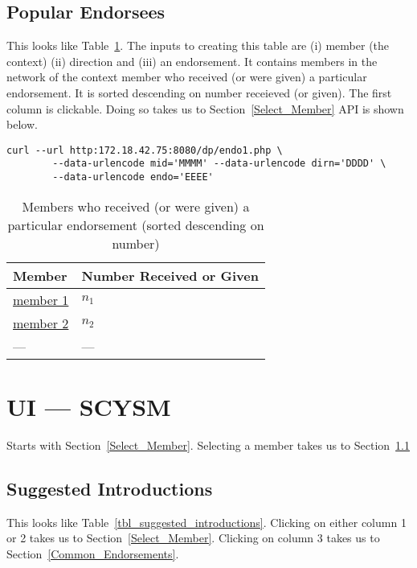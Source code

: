 \subsection{Popular Endorsees}
\label{Popular_Endorsees}

This looks like Table~\ref{tbl_popular_endorsees}. The inputs to
creating this table are (i) member (the context) (ii) direction and (iii) an
endorsement. 
It contains members in the network of the context member who 
received (or were given) a particular endorsement. It is sorted descending 
on number receieved (or given).
The first column is
clickable. Doing so takes us to Section~\ref{Select_Member}
API is shown below.
\begin{verbatim}
curl --url http:172.18.42.75:8080/dp/endo1.php \
       	--data-urlencode mid='MMMM' --data-urlencode dirn='DDDD' \
       	--data-urlencode endo='EEEE' 
\end{verbatim}


\begin{table}[hb]
\centering
\begin{tabular}{|l|l|} \hline \hline
{\bf Member} & {\bf Number Received or Given} \\ \hline \hline
\url{member 1} & \(n_1\) \\ \hline 
\url{member 2} & \(n_2\) \\ \hline 
--- & --- \\ \hline
\hline
\end{tabular}
\caption{Members who received (or were given) a particular endorsement (sorted descending on number)}
\label{tbl_popular_endorsees}
\end{table}


\section{UI --- SCYSM }
\label{ui_scysm}


Starts with Section~\ref{Select_Member}. Selecting a member takes us to
Section~\ref{Suggested_Introductions}

\subsection{Suggested Introductions}
\label{Suggested_Introductions}

This looks like Table~\ref{tbl_suggested_introductions}. 
Clicking on either column 1 or 2 takes us to Section~\ref{Select_Member}.
Clicking on column 3 takes us to Section~\ref{Common_Endorsements}.

